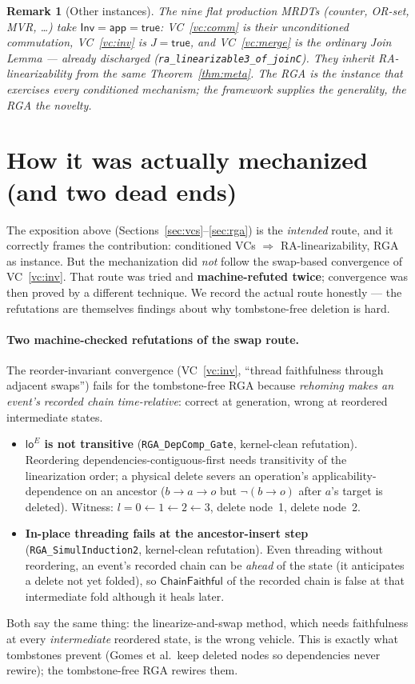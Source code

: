 \documentclass[11pt]{article}
\newtheorem{remark}[theorem]{Remark}
\newcommand{\loE}[1]{\mathsf{lo}^{#1}}
\newcommand{\lean}[1]{\texttt{#1}}
\newcommand{\Inv}{\mathsf{Inv}}
\newcommand{\app}{\mathsf{app}}
\newcommand{\ChainFaithful}{\textsf{ChainFaithful}}
\begin{document}
\begin{remark}[Other instances]
The nine flat production MRDTs (counter, OR-set, MVR, \dots) take $\Inv=\app=\mathsf{true}$:
VC~\ref{vc:comm} is their unconditioned commutation, VC~\ref{vc:inv} is $J=\mathsf{true}$,
and VC~\ref{vc:merge} is the ordinary Join Lemma --- already discharged
(\lean{ra\_linearizable3\_of\_joinC}). They inherit RA-linearizability from the same
Theorem~\ref{thm:meta}. The RGA is the instance that exercises every conditioned mechanism;
the framework supplies the generality, the RGA the novelty.
\end{remark}

\section{How it was actually mechanized (and two dead ends)}\label{sec:actual}

The exposition above (Sections~\ref{sec:vcs}--\ref{sec:rga}) is the \emph{intended} route, and it
correctly frames the contribution: conditioned VCs $\Rightarrow$ RA-linearizability, RGA as
instance. But the mechanization did \emph{not} follow the swap-based convergence of
VC~\ref{vc:inv}. That route was tried and \textbf{machine-refuted twice}; convergence was then
proved by a different technique. We record the actual route honestly --- the refutations are
themselves findings about why tombstone-free deletion is hard.

\paragraph{Two machine-checked refutations of the swap route.} The reorder-invariant convergence
(VC~\ref{vc:inv}, ``thread faithfulness through adjacent swaps'') fails for the tombstone-free
RGA because \emph{rehoming makes an event's recorded chain time-relative}: correct at generation,
wrong at reordered intermediate states.
\begin{itemize}[nosep]
  \item \textbf{$\loE{E}$ is not transitive} (\lean{RGA\_DepComp\_Gate}, kernel-clean refutation).
  Reordering dependencies-contiguous-first needs transitivity of the linearization order; a
  physical delete severs an operation's applicability-dependence on an ancestor
  ($b\!\to\!a\!\to\!o$ but $\neg(b\!\to\!o)$ after $a$'s target is deleted). Witness:
  $l=0\!\leftarrow\!1\!\leftarrow\!2\!\leftarrow\!3$, delete node~1, delete node~2.
  \item \textbf{In-place threading fails at the ancestor-insert step}
  (\lean{RGA\_SimulInduction2}, kernel-clean refutation). Even threading without reordering, an
  event's recorded chain can be \emph{ahead} of the state (it anticipates a delete not yet folded),
  so $\ChainFaithful$ of the recorded chain is false at that intermediate fold although it heals
  later.
\end{itemize}
Both say the same thing: the linearize-and-swap method, which needs faithfulness at every
\emph{intermediate} reordered state, is the wrong vehicle. This is exactly what tombstones prevent
(Gomes et al.\ keep deleted nodes so dependencies never rewire); the tombstone-free RGA rewires
them.
\end{document}
